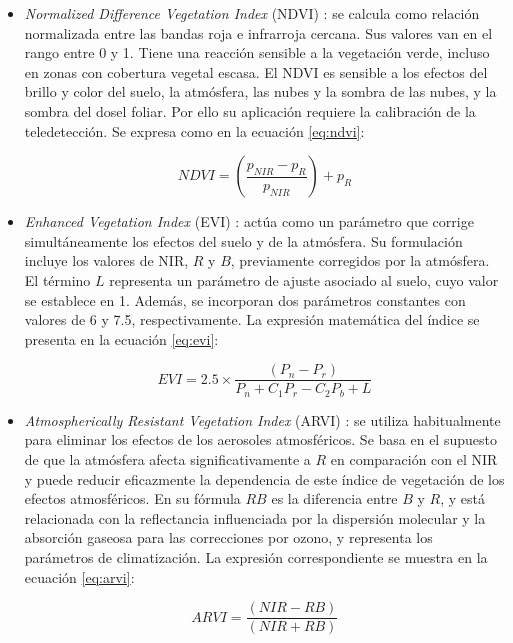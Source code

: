 \begin{itemize}
	\item \textit{Normalized Difference Vegetation Index} (NDVI) \citep{Xue2017}: se calcula como 
	   	relación normalizada entre las bandas roja e infrarroja cercana. Sus valores van en el rango
	   	entre 0 y 1. Tiene una reacción sensible a la vegetación verde, incluso en zonas con cobertura 
		vegetal escasa. El NDVI es sensible a los efectos del brillo y color del suelo,
		la atmósfera, las nubes y la sombra de las nubes, y la sombra del dosel foliar. Por ello su
		aplicación requiere la calibración de la teledetección. Se expresa como en la ecuación \ref{eq:ndvi}:
	
		\begin{equation}
			\label{eq:ndvi}
			NDVI = \left( \frac{p_{NIR} - p_{R}}{p_{NIR}} \right) + p_{R}
		\end{equation}

	\item \textit{Enhanced Vegetation Index} (EVI) \citep{Xue2017}: actúa como un parámetro que 
		corrige simultáneamente los efectos del suelo y de la atmósfera. Su formulación incluye los valores de NIR,
		 $R$ y $B$, previamente corregidos por la atmósfera. El término $L$ representa un parámetro de ajuste asociado
		  al suelo, cuyo valor se establece en 1. Además, se incorporan dos parámetros constantes con valores de 6 y 
		  7.5, respectivamente. La expresión matemática del índice se presenta en la ecuación \ref{eq:evi}:

		\begin{equation}
			\label{eq:evi}
			EVI = 2.5 \times \frac{(P_n - P_r)}{P_n + C_1 P_r - C_2 P_b + L}
		\end{equation}

	\item \textit{Atmospherically Resistant Vegetation Index} (ARVI) \citep{Xue2017}: se utiliza habitualmente para eliminar los efectos de los
		aerosoles atmosféricos. Se basa en el supuesto de que la atmósfera afecta significativamente a $R$ en comparación con el 
		NIR y puede reducir eficazmente la dependencia de este índice de vegetación de los efectos atmosféricos. En su fórmula 
		$RB$ es la diferencia entre $B$ y $R$, y está relacionada con la reflectancia influenciada por la dispersión molecular y la absorción gaseosa para 
		las correcciones por ozono, y representa los parámetros de climatización. La expresión correspondiente se muestra en la ecuación \ref{eq:arvi}:

		\begin{equation}
			\label{eq:arvi}
			ARVI = \frac{(NIR - RB)}{(NIR + RB)}
		\end{equation}
	

\end{itemize}

